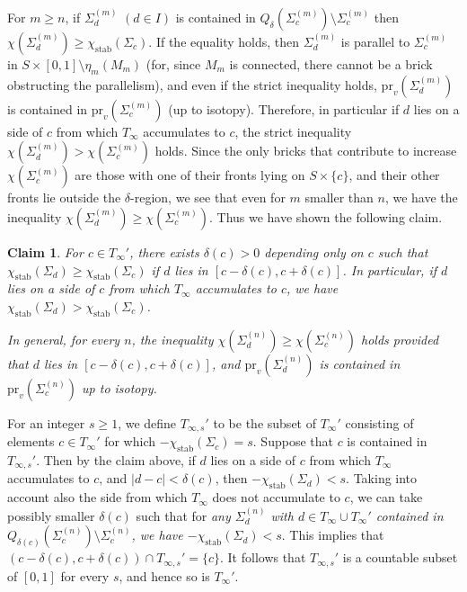 \documentclass{amsart}
\newtheorem{claim}[theorem]{Claim}
\theoremstyle{definition}
\numberwithin{figure}{section}
\numberwithin{equation}{section}
\newcommand{\pr}{\mathrm{pr}}
\newcommand{\stab}{\mathrm{stab}}
\def\eset{\emptyset}
\def\Sg{\Sigma}
\def\Sg{\Sigma}
\begin{document}
For $m \geq n$, if $\Sg_d^{(m)}$ $(d\in I)$ is contained in $Q_\delta(\Sg_c^{(m)})\setminus \Sg_c^{(m)}$ then $\chi(\Sg_d^{(m)})\geq \chi_{\stab}(\Sg_c)$.
If  the equality holds, then $\Sg_d^{(m)}$ is parallel to $\Sg_c^{(m)}$ in $S\times [0,1]\setminus \eta_m(M_m)$ (for, since $M_m$ is connected, there cannot be a brick obstructing the parallelism), and even if the strict inequality holds, $\pr_v(\Sg_d^{(m)})$ is contained in $\pr_v(\Sg_c^{(m)})$ (up to isotopy).
Therefore, in particular if $d$ lies on a side of $c$ from which $T_\infty$ accumulates to $c$, the strict inequality $\chi(\Sg_d^{(m)}) > \chi(\Sg_c^{(m)})$ holds.
Since the only bricks that contribute to increase $\chi(\Sg_c^{(m)})$ are those with one of their fronts lying on $S \times \{c\}$, and their other fronts lie outside the $\delta$-region, we see that even for  $m$ smaller than $n$, we have the inequality $\chi(\Sg_d^{(m)}) \geq \chi(\Sg_c^{(m)})$.
Thus we have shown the following claim.
\begin{claim}
\label{delta-region}
For $c\in T_{\infty}'$, there exists $\delta(c)>0$ depending only on $c$ such that $\chi_{\stab}(\Sg_d)\geq \chi_{\stab}(\Sg_c)$ if $d$ lies in $[c-\delta(c), c+\delta(c)]$.
In particular, if $d$ lies on a side of $c$ from which $T_\infty$ accumulates to $c$, we have $\chi_{\stab}(\Sg_d)>\chi_{\stab}(\Sg_c)$.

In general, for every $n$, the inequality $\chi(\Sg_d^{(n)})\geq  \chi(\Sg_c^{(n)})$ holds provided that $d$ lies in $[c-\delta(c), c+\delta(c)]$, and $\pr_v(\Sg_d^{(n)})$ is contained in $\pr_v(\Sg_c^{(n)})$ up to isotopy.
\end{claim}

For an integer $s\geq 1$, we define $T_{\infty,s}'$ to be the subset of $T_\infty'$ consisting of elements $c\in T_\infty'$ for which 
$-\chi_{\stab}(\Sg_c)=s$.
Suppose that $c$ is contained in $T_{\infty, s}'$.
Then by the claim above, if $d$ lies on a side of $c$ from which $T_\infty$ accumulates to $c$, and $|d-c|< \delta(c)$, then $-\chi_{\stab}(\Sg_d) < s$.
Taking into account also the side from which $T_\infty$ does not accumulate to $c$, we can take possibly smaller $\delta(c)$ such that for {\em any $\Sigma_d^{(n)}$ with $d \in T_\infty \cup T_\infty'$ contained in $Q_{\delta(c)}(\Sg_c^{(n)})\setminus \Sg_c^{(n)}$, we have $-\chi_{\stab}(\Sg_d)<s$}.
This implies that $(c-\delta(c), c+\delta(c)) \cap T_{\infty, s}'=\{c\}$.
It follows that  $T_{\infty,s}'$ is a countable subset of $[0,1]$ for every $s$, and hence so is $T_\infty'$.
\end{document}
